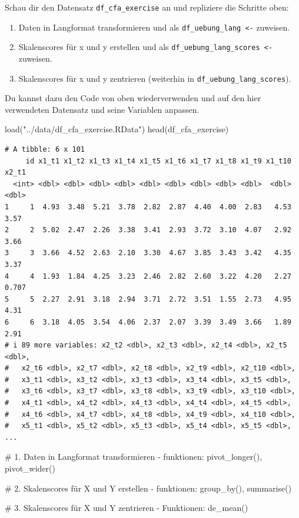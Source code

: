 \documentclass[
  letterpaper,
  DIV=11,
  numbers=noendperiod]{scrreprt}
\newenvironment{Shaded}{\begin{snugshade}}{\end{snugshade}}
\newcommand{\CommentTok}[1]{\textcolor[rgb]{0.37,0.37,0.37}{#1}}
\newcommand{\FunctionTok}[1]{\textcolor[rgb]{0.28,0.35,0.67}{#1}}
\newcommand{\NormalTok}[1]{\textcolor[rgb]{0.00,0.23,0.31}{#1}}
\newcommand{\StringTok}[1]{\textcolor[rgb]{0.13,0.47,0.30}{#1}}
\providecommand{\tightlist}{%
  \setlength{\itemsep}{0pt}\setlength{\parskip}{0pt}}\usepackage{longtable,booktabs,array}
\begin{document}
Schau dir den Datensatz \texttt{df\_cfa\_exercise} an und repliziere die
Schritte oben:

\begin{enumerate}
\def\labelenumi{\arabic{enumi})}
\tightlist
\item
  Daten in Langformat transformieren und als
  \texttt{df\_uebung\_lang\ \textless{}-} zuweisen.
\item
  Skalenscores für x und y erstellen und als
  \texttt{df\_uebung\_lang\_scores\ \textless{}-} zuweisen.
\item
  Skalenscores für x und y zentrieren (weiterhin in
  \texttt{df\_uebung\_lang\_scores}).
\end{enumerate}

Du kannst dazu den Code von oben wiederverwenden und auf den hier
verwendeten Datensatz und seine Variablen anpassen.

\begin{Shaded}
\begin{Highlighting}[]
\FunctionTok{load}\NormalTok{(}\StringTok{"../data/df\_cfa\_exercise.RData"}\NormalTok{)}
\FunctionTok{head}\NormalTok{(df\_cfa\_exercise)}
\end{Highlighting}
\end{Shaded}

\begin{verbatim}
# A tibble: 6 x 101
     id x1_t1 x1_t2 x1_t3 x1_t4 x1_t5 x1_t6 x1_t7 x1_t8 x1_t9 x1_t10 x2_t1
  <int> <dbl> <dbl> <dbl> <dbl> <dbl> <dbl> <dbl> <dbl> <dbl>  <dbl> <dbl>
1     1  4.93  3.48  5.21  3.78  2.82  2.87  4.40  4.00  2.83   4.53 3.57 
2     2  5.02  2.47  2.26  3.38  3.41  2.93  3.72  3.10  4.07   2.92 3.66 
3     3  3.66  4.52  2.63  2.10  3.30  4.67  3.85  3.43  3.42   4.35 3.37 
4     4  1.93  1.84  4.25  3.23  2.46  2.82  2.60  3.22  4.20   2.27 0.707
5     5  2.27  2.91  3.18  2.94  3.71  2.72  3.51  1.55  2.73   4.95 4.31 
6     6  3.18  4.05  3.54  4.06  2.37  2.07  3.39  3.49  3.66   1.89 2.91 
# i 89 more variables: x2_t2 <dbl>, x2_t3 <dbl>, x2_t4 <dbl>, x2_t5 <dbl>,
#   x2_t6 <dbl>, x2_t7 <dbl>, x2_t8 <dbl>, x2_t9 <dbl>, x2_t10 <dbl>,
#   x3_t1 <dbl>, x3_t2 <dbl>, x3_t3 <dbl>, x3_t4 <dbl>, x3_t5 <dbl>,
#   x3_t6 <dbl>, x3_t7 <dbl>, x3_t8 <dbl>, x3_t9 <dbl>, x3_t10 <dbl>,
#   x4_t1 <dbl>, x4_t2 <dbl>, x4_t3 <dbl>, x4_t4 <dbl>, x4_t5 <dbl>,
#   x4_t6 <dbl>, x4_t7 <dbl>, x4_t8 <dbl>, x4_t9 <dbl>, x4_t10 <dbl>,
#   x5_t1 <dbl>, x5_t2 <dbl>, x5_t3 <dbl>, x5_t4 <dbl>, x5_t5 <dbl>, ...
\end{verbatim}

\begin{Shaded}
\begin{Highlighting}[]
\CommentTok{\# 1. Daten in Langformat transformieren {-} funktionen: pivot\_longer(), pivot\_wider()}


\CommentTok{\# 2. Skalenscores für X und Y erstellen {-} funktionen: group\_by(), summarise()}

\CommentTok{\# 3. Skalenscores für X und Y zentrieren {-} Funktionen: de\_mean()}
\end{Highlighting}
\end{Shaded}
\end{document}
